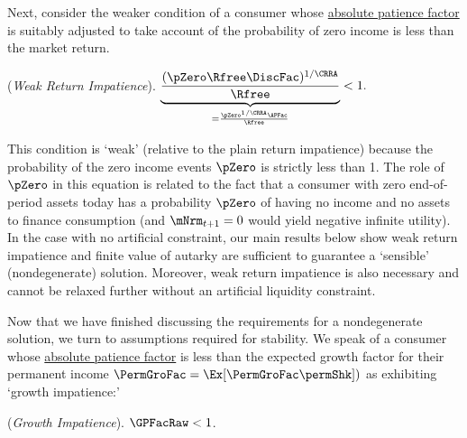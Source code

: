 \documentclass[BufferStockTheory]{subfiles}
\begin{document}
Next, consider the weaker condition of a consumer whose \hyperlink{APFAC}{absolute patience factor} is suitably adjusted to take account of the probability of zero income is less than the market return.

%
\hypertarget{WRIC}{}
\begin{assumL} (\textit{Weak Return Impatience}). \label{ass:WRIC}
$\underbrace{\frac{(\pZero \Rfree \DiscFac)^{1/\CRRA}}{\Rfree}}_{ = \frac{\pZero^{1/\CRRA} \APFac}{\Rfree}} < 1. \phantom{\text{{\WRIC}:~~}}$
%
\end{assumL}

This condition is `weak' (relative to the plain return impatience) because the probability of the zero income events $\pZero$ is strictly less than 1.
The role of $\pZero$ in this equation is related to the fact that a consumer with zero end-of-period assets today has a probability $\pZero$ of having no income and no assets to finance consumption (and $\mNrm_{t+1}=0$ would yield negative infinite utility).
In the case with no artificial constraint, our main results below show weak return impatience and finite value of autarky are sufficient to guarantee a `sensible' (nondegenerate) solution.
Moreover, weak return impatience is also necessary and cannot be relaxed further without an artificial liquidity constraint.



\begin{comment}
\marginpar{\tiny \textcolor{orange}{Review the remark under comment in latex.
what do we mean by does not approach irrelevance?
Should this even be a Remark?}}
\begin{remark}
Even though $\pZero^{1/\CRRA} \RPFac\rightarrow 0$ as $\pZero\rightarrow 0$ \textcolor{orange}{the weak return impatience condition \textit{does not} approach irrelevance} as the possibility of the zero income event approaches zero.  Instead, we show below that the model with a natural constraint approaches the solution to a model with an artificial constraint. %
\end{remark}
\end{comment}


Now that we have finished discussing the requirements for a nondegenerate solution, we turn to assumptions required for stability.
We speak of a consumer whose \hyperlink{APFAC}{absolute patience factor} is less than the expected growth factor for their permanent income $\PermGroFac = \Ex[\PermGroFac \permShk])$ as exhibiting `growth impatience:' 
\hypertarget{GPFacRawDefn}{}
\hypertarget{GICRaw}{}
\begin{assumS}\label{ass:GICRaw} (\textit{Growth Impatience}).
$ \GPFacRaw  < 1$.
\end{assumS}
\end{document}
